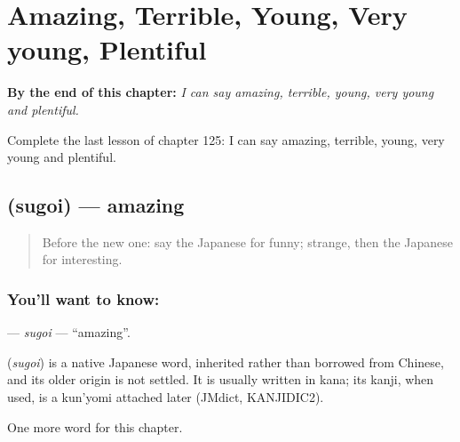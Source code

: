 
\chapter{Amazing, Terrible, Young, Very young, Plentiful}
\label{ch:ja-amazing-terrible-young-very-young-plentiful}

\begin{chapteropening}
\textbf{By the end of this chapter:} \emph{I can say amazing, terrible, young, very young and plentiful.}

Complete the last lesson of chapter 125: I can say amazing, terrible, young, very young and plentiful.
\end{chapteropening}

\section[\texorpdfstring{\ja{すごい} (sugoi)}{すごい (sugoi)}]{ (sugoi) — amazing}

\label{lesson:JA-C125-sugoi}



\begin{quote}
Before the new one: say the Japanese for funny; strange, then the Japanese for interesting.
\end{quote}

\subsection*{You'll want to know: }
\textbf{} — \emph{sugoi} — \textquotedblleft{}amazing\textquotedblright{}.

\begin{cousinweb}
\textbf{} (\emph{sugoi}) is a native Japanese word, inherited rather than borrowed from Chinese, and its older origin is not settled. It is usually written in kana; its kanji, when used, is a kun'yomi attached later (JMdict, KANJIDIC2).
\end{cousinweb}

\begin{grammarlens}[title={What you've built}]
One more word for this chapter.
\end{grammarlens}

